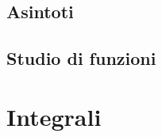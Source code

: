 \documentclass[a4paper]{article}
\begin{document}
\subsection{Asintoti}






\subsection{Studio di funzioni}

\section{Integrali}

\end{document}
